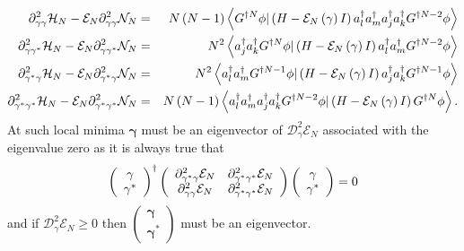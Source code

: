 \documentclass[aps,preprint]{revtex4}
\begin{document}
\begin{eqnarray}
\mathrm{\partial }_{\gamma \gamma }^{2}\mathcal{H}_{N}-\mathcal{E}_{N}%
\mathrm{\partial }_{\gamma \gamma }^{2}\mathcal{N}_{N} &=&N\left( N-1\right)
\left\langle G^{\dagger N}\phi |\left( H-\mathcal{E}_{N}\left( \mathbf{%
\gamma }\right) I\right) a_{l}^{\dagger }a_{m}^{\dagger }a_{j}^{\dagger
}a_{k}^{\dagger }G^{\dagger N-2}\phi \right\rangle   \nonumber \\
\mathrm{\partial }_{\gamma \gamma ^{\ast }}^{2}\mathcal{H}_{N}-\mathcal{E}%
_{N}\mathrm{\partial }_{\gamma \gamma ^{\ast }}^{2}\mathcal{N}_{N}
&=&N^{2}\left\langle a_{j}^{\dagger }a_{k}^{\dagger }G^{\dagger N}\phi
|\left( H-\mathcal{E}_{N}\left( \mathbf{\gamma }\right) I\right)
a_{l}^{\dagger }a_{m}^{\dagger }G^{\dagger N-2}\phi \right\rangle   \nonumber
\\
\mathrm{\partial }_{\gamma ^{\ast }\gamma }^{2}\mathcal{H}_{N}-\mathcal{E}%
_{N}\mathrm{\partial }_{\gamma ^{\ast }\gamma }^{2}\mathcal{N}_{N}
&=&N^{2}\left\langle a_{l}^{\dagger }a_{m}^{\dagger }G^{\dagger N-1}\phi
|\left( H-\mathcal{E}_{N}\left( \mathbf{\gamma }\right) I\right)
a_{j}^{\dagger }a_{k}^{\dagger }G^{\dagger N-1}\phi \right\rangle   \nonumber
\\
\mathrm{\partial }_{\gamma ^{\ast }\gamma ^{\ast }}^{2}\mathcal{H}_{N}-%
\mathcal{E}_{N}\mathrm{\partial }_{\gamma ^{\ast }\gamma ^{\ast }}^{2}%
\mathcal{N}_{N} &=&N\left( N-1\right) \left\langle a_{l}^{\dagger
}a_{m}^{\dagger }a_{j}^{\dagger }a_{k}^{\dagger }G^{\dagger N-2}\phi |\left(
H-\mathcal{E}_{N}\left( \mathbf{\gamma }\right) I\right) G^{\dagger N}\phi
\right\rangle .
\end{eqnarray}%
At such local minima $\mathbf{\gamma }$ must be an eigenvector of $\mathcal{D%
}_{\gamma }^{2}\mathcal{E}_{N}$ associated with the eigenvalue zero as it is
always true that 
\begin{equation}
\left( 
\begin{array}{c}
\mathbf{\gamma } \\ 
\mathbf{\gamma }^{\ast }%
\end{array}%
\right) ^{\dagger }\left( 
\begin{array}{cc}
\mathrm{\partial }_{\gamma ^{\ast }\gamma }^{2}\mathcal{E}_{N} & \mathrm{%
\partial }_{\gamma ^{\ast }\gamma ^{\ast }}^{2}\mathcal{E}_{N} \\ 
\mathrm{\partial }_{\gamma \gamma }^{2}\mathcal{E}_{N} & \mathrm{\partial }%
_{\gamma ^{\ast }\gamma ^{\ast }}^{2}\mathcal{E}_{N}%
\end{array}%
\right) \left( 
\begin{array}{c}
\mathbf{\gamma } \\ 
\mathbf{\gamma }^{\ast }%
\end{array}%
\right) =0
\end{equation}%
and if $\mathcal{D}_{\gamma }^{2}\mathcal{E}_{N}\geqslant 0$ then $\left( 
\begin{array}{c}
\mathbf{\gamma } \\ 
\mathbf{\gamma }^{\ast }%
\end{array}%
\right) $ must be an eigenvector.
\end{document}
